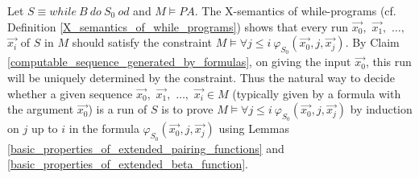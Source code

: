 \documentclass[a4paper,11pt]{article}
\begin{document}
Let $S\equiv while\ B\ do\ S_0\ od$ and $M\models PA$. The X-semantics of while-programs (cf. Definition \ref{X_semantics_of_while_programs}) shows that every run $\vec{x_0},$ $\vec{x_1},$ $\ldots,$ $\vec{x_i}$ of $S$ in $M$ should satisfy the constraint $M\models \forall j\leq i\ \varphi_{S_0}(\vec{x_0},j,\vec{x_j})$. By Claim \ref{computable_sequence_generated_by_formulas}, on giving the input $\vec{x_0}$, this run will be uniquely determined by the constraint. Thus the natural way to decide whether a given sequence $\vec{x_0},$ $\vec{x_1},$ $\ldots,$ $\vec{x_i}\in M$ (typically given by a formula with the argument $\vec{x_0}$) is a run of $S$ is to prove $M\models \forall j\leq i\ \varphi_{S_0}(\vec{x_0},j,\vec{x_j})$ by induction on $j$ up to $i$ in the formula $\varphi_{S_0}(\vec{x_0},j,\vec{x_j})$ using Lemmas \ref{basic_properties_of_extended_pairing_functions} and \ref{basic_properties_of_extended_beta_function}.
\end{document}
